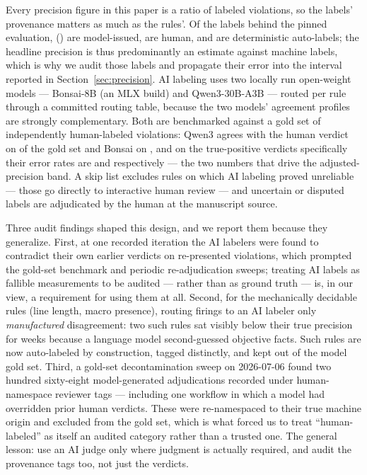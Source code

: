 \documentclass[nojss,article]{jss}
\begin{document}
Every precision figure in this paper is a ratio of labeled
violations, so the labels' provenance matters as much as the rules'.
Of the \StatLabelsTotal{} labels behind the pinned evaluation,
\StatLabelsAI{} (\StatLabelsAIShare{}) are model-issued,
\StatLabelsHuman{} are human, and \StatLabelsAuto{} are deterministic
auto-labels; the headline precision is thus predominantly an estimate
against machine labels, which is why we audit those labels and
propagate their error into the interval reported in
Section~\ref{sec:precision}. AI labeling uses two locally run
open-weight models --- Bonsai-8B (an MLX build) and Qwen3-30B-A3B ---
routed per rule through a committed routing table, because the two
models' agreement profiles are strongly complementary. Both are
benchmarked against a gold set of \StatGoldSetSize{} independently
human-labeled violations: Qwen3 agrees with the human verdict on
\StatGoldAgreementQwen{} of the gold set and Bonsai on
\StatGoldAgreementBonsai{}, and on the true-positive verdicts
specifically their error rates are \StatGoldTPErrQwen{} and
\StatGoldTPErrBonsai{} respectively --- the two numbers that drive
the adjusted-precision band. A skip list excludes rules on which AI
labeling proved unreliable --- those go directly to interactive human
review --- and uncertain or disputed labels are adjudicated by the
human at the manuscript source.

Three audit findings shaped this design, and we report them because
they generalize. First, at one recorded iteration the AI labelers
were found to contradict their own earlier verdicts on re-presented
violations, which prompted the gold-set benchmark and periodic
re-adjudication sweeps; treating AI labels as fallible measurements
to be audited --- rather than as ground truth --- is, in our view, a
requirement for using them at all. Second, for the
\StatDeterministicCount{} mechanically decidable rules (line length,
macro presence), routing firings to an AI labeler only
\emph{manufactured} disagreement: two such rules sat visibly below
their true precision for weeks because a language model
second-guessed objective facts. Such rules are now auto-labeled by
construction, tagged distinctly, and kept out of the model gold set.
Third, a gold-set decontamination sweep on 2026-07-06 found two
hundred sixty-eight model-generated adjudications recorded under
human-namespace reviewer tags --- including one workflow in which a
model had overridden prior human verdicts. These were re-namespaced to their true machine origin
and excluded from the gold set, which is what forced us to treat
``human-labeled'' as itself an audited category rather than a trusted
one. The general lesson: use an AI judge only where judgment is
actually required, and audit the provenance tags too, not just the
verdicts.
\end{document}
